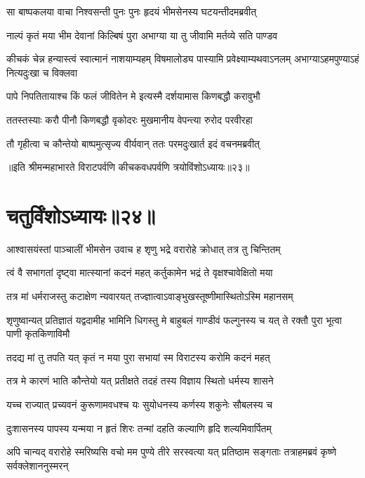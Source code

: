 \twolineshloka
{सा बाष्पकलया वाचा निश्वसन्ती पुनः पुनः}
{हृदयं भीमसेनस्य घटयन्तीदमब्रवीत्}


\twolineshloka
{नाल्पं कृतं मया भीम देवानां किल्बिषं पुरा}
{अभाग्या या तु जीवामि मर्तव्ये सति पाण्डव}


\threelineshloka
{कीचकं चेन्न हन्यास्त्वं स्वात्मानं नाशयाम्यहम्}
{विषमालोड्य पास्यामि प्रवेक्ष्याम्यथवाऽनलम्}
{अभाग्याऽहमपुण्याऽहं नित्यदुःखा च विक्लवा}


\twolineshloka
{पापे निपतितायाश्च किं फलं जीवितेन मे}
{इत्यस्मै दर्शयामास किणबद्धौ करावुभौ}


\twolineshloka
{ततस्तस्याः करौ पीनौ किणबद्धौ वृकोदरः}
{मुखमानीय वेपन्त्या रुरोद परवीरहा}


\twolineshloka
{तौ गृहीत्वा च कौन्तेयो बाष्पमुत्सृज्य वीर्यवान्}
{ततः परमदुःखार्त इदं वचनमब्रवीत्}

॥इति श्रीमन्महाभारते विराटपर्वणि कीचकवधपर्वणि त्रयोविंशोऽध्यायः॥२३॥

\chapter{चतुर्विंशोऽध्यायः॥२४॥}

\twolineshloka
{आश्वासयंस्तां पाञ्चालीं भीमसेन उवाच ह}
{शृणु भद्रे वरारोहे क्रोधात् तत्र तु चिन्तितम्}


\twolineshloka
{त्वं वै सभागतां दृष्ट्वा मात्स्यानां कदनं महत्}
{कर्तुकामेन भद्रं ते वृक्षश्चावेक्षितो मया}


\twolineshloka
{तत्र मां धर्मराजस्तु कटाक्षेण न्यवारयत्}
{तज्ज्ञात्वाऽवाङ्भुखस्तूष्णीमास्थितोऽस्मि महानसम्}


\threelineshloka
{शृणुष्वान्यत् प्रतिज्ञातं यद्वदामीह भामिनि}
{धिगस्तु मे बाहुबलं गाण्डीवं फल्गुनस्य च}
{यत् ते रक्तौ पुरा भूत्वा पाणी कृतकिणाविमौ}


\twolineshloka
{तदद्य मां तु तपति यत् कृतं न मया पुरा}
{सभायां स्म विराटस्य करोमि कदनं महत्}


\twolineshloka
{तत्र मे कारणं भाति कौन्तेयो यत् प्रतीक्षते}
{तदहं तस्य विज्ञाय स्थितो धर्मस्य शासने}


\twolineshloka
{यच्च राज्यात् प्रच्यवनं कुरूणामवधश्च यः}
{सुयोधनस्य कर्णस्य शकुनेः सौबलस्य च}


\twolineshloka
{दुःशासनस्य पापस्य यन्मया न हृतं शिरः}
{तन्मां दहति कल्याणि हृदि शल्यमिवार्पितम्}


\threelineshloka
{अपि चान्यद् वरारोहे स्मरिष्यसि वचो मम}
{पुण्ये तीरे सरस्वत्या यत् प्रतिष्ठाम सङ्गताः}
{तत्राहमब्रवं कृष्णे सर्वक्लेशाननुस्मरन्}


